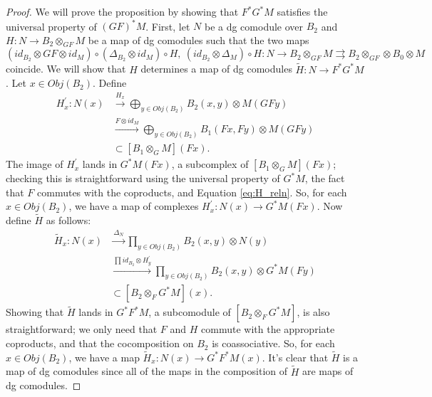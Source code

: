 \begin{proof}
We will prove the proposition by showing that 
$F^*G^*M$ satisfies the universal property of 
$(GF)^*M$. First, let $N$ be a dg comodule over $B_2$ 
and $H: N \to B_2 \otimes_{GF} M$ be a map of 
dg comodules such that the two maps 
\begin{equation}\label{eq:H_reln}
(id_{B_2} \otimes GF \otimes id_M) \circ 
(\Delta_{B_2}\otimes id_M) \circ H, \>
(id_{B_2} \otimes \Delta_M) \circ H: 
N \to B_2 \otimes_{GF} M
\rightrightarrows 
B_2 \otimes_{GF} \otimes B_0 \otimes M
\end{equation}
coincide. We will show that $H$ determines a 
map of dg comodules $\tilde{H}: N \to F^*G^*M$. 
Let $x \in Obj(B_2)$. Define 
\begin{align*}
H^\prime_x: N(x)
&\xrightarrow{H_x}
\bigoplus \limits_{y \in Obj(B_2)}
  B_2(x,y) \otimes M(GFy)\\
&\xrightarrow{F \otimes id_M}
\bigoplus \limits_{y \in Obj(B_2)}
  B_1(Fx,Fy) \otimes M(GFy)\\
&\subset
[B_1 \otimes_G M](Fx).  
\end{align*}
The image of $H^\prime_x$ lands in 
$G^*M(Fx)$, a subcomplex of 
$[B_1 \otimes_G M](Fx)$; checking 
this is straightforward using the 
universal property of $G^*M$, the 
fact that $F$ commutes with the 
coproducts, and Equation \ref{eq:H_reln}. 
So, for 
each $x \in Obj(B_2)$, we have a map  
of complexes $H^\prime_x: N(x) \to 
G^*M(Fx)$. Now define $\tilde{H}$ as 
follows:
\begin{align*}
\tilde{H}_x: N(x) 
&\xrightarrow{\Delta_N}
\prod \limits_{y \in Obj(B_2)}
  B_2(x,y) \otimes N(y)\\
&\xrightarrow{\prod id_{B_2} \otimes H^\prime_y}  
\prod \limits_{y \in Obj(B_2)}
  B_2(x,y) \otimes G^*M(Fy)\\
&\subset
[B_2 \otimes_F G^*M](x).
\end{align*}
Showing that $\tilde{H}$ lands in 
$G^*F^*M$, a subcomodule of 
$[B_2 \otimes_F G^*M]$, is also 
straightforward; we only need that 
$F$ and $H$ commute with the appropriate 
coproducts, and that the cocomposition 
on $B_2$ is coassociative. So, for each 
$x \in Obj(B_2)$, we have a map 
$\tilde{H}_x: N(x) \to G^*F^*M(x)$. 
It's clear that $\tilde{H}$ is a map 
of dg comodules since all of the maps in 
the composition of $\tilde{H}$ are maps 
of dg comodules.


\end{proof}
